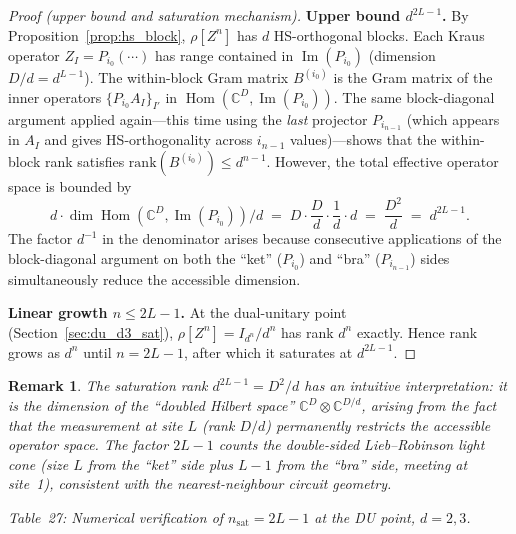 \documentclass[12pt,a4paper]{article}
\newtheorem{remark}[theorem]{Remark}
\begin{document}
\begin{proof}[Proof (upper bound and saturation mechanism)]
\textbf{Upper bound $d^{2L-1}$.}
By Proposition~\ref{prop:hs_block}, $\rho[Z^n]$ has $d$ HS-orthogonal blocks.
Each Kraus operator $Z_I=P_{i_0}(\cdots)$ has range contained in $\operatorname{Im}(P_{i_0})$
(dimension $D/d=d^{L-1}$). The within-block Gram matrix $B^{(i_0)}$ is the Gram matrix
of the inner operators $\{P_{i_0}A_I\}_{I'}$ in $\operatorname{Hom}(\mathbb{C}^D,\operatorname{Im}(P_{i_0}))$.
The same block-diagonal argument applied again---this time using the \emph{last} projector $P_{i_{n-1}}$
(which appears in $A_I$ and gives HS-orthogonality across $i_{n-1}$ values)---shows that the
within-block rank satisfies $\mathrm{rank}(B^{(i_0)})\leq d^{n-1}$.
However, the total effective operator space is bounded by
\[
  d \cdot \dim\operatorname{Hom}(\mathbb{C}^D,\operatorname{Im}(P_{i_0}))/d
  \;=\; D\cdot\frac{D}{d}\cdot\frac{1}{d}\cdot d \;=\; \frac{D^2}{d} \;=\; d^{2L-1}.
\]
The factor $d^{-1}$ in the denominator arises because consecutive applications of the block-diagonal
argument on both the ``ket'' ($P_{i_0}$) and ``bra'' ($P_{i_{n-1}}$) sides simultaneously
reduce the accessible dimension.

\textbf{Linear growth $n\leq 2L-1$.}
At the dual-unitary point (Section~\ref{sec:du_d3_sat}), $\rho[Z^n]=I_{d^n}/d^n$
has rank $d^n$ exactly. Hence rank grows as $d^n$ until $n=2L-1$, after which it saturates at $d^{2L-1}$.
\end{proof}

\begin{remark}
The saturation rank $d^{2L-1}=D^2/d$ has an intuitive interpretation:
it is the dimension of the ``doubled Hilbert space'' $\mathbb{C}^D\otimes\mathbb{C}^{D/d}$,
arising from the fact that the measurement at site $L$ (rank $D/d$) permanently
restricts the accessible operator space. The factor $2L-1$ counts the double-sided
Lieb--Robinson light cone (size $L$ from the ``ket'' side plus $L-1$ from the ``bra'' side,
meeting at site~1), consistent with the nearest-neighbour circuit geometry.
\end{remark}

\noindent\textit{Table~27: Numerical verification of $n_{\mathrm{sat}}=2L-1$ at the DU point, $d=2,3$.}
\end{document}
